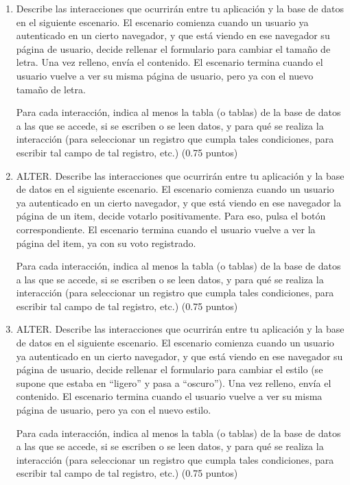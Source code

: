 \begin{enumerate}
\item Describe las interacciones que ocurrirán entre tu aplicación y la base de datos en el siguiente escenario. El escenario comienza cuando un usuario ya autenticado en un cierto navegador, y que está viendo en ese navegador su página de usuario, decide rellenar el formulario para cambiar el tamaño de letra. Una vez relleno, envía el contenido. El escenario termina cuando el usuario vuelve a ver su misma página de usuario, pero ya con el nuevo tamaño de letra.
  
  Para cada interacción, indica al menos la tabla (o tablas) de la base de datos a las que se accede, si se escriben o se leen datos, y para qué se realiza la interacción (para seleccionar un registro que cumpla tales condiciones, para escribir tal campo de tal registro, etc.)  (0.75 puntos)

  
\item ALTER. Describe las interacciones que ocurrirán entre tu aplicación y la base de datos en el siguiente escenario. El escenario comienza cuando un usuario ya autenticado en un cierto navegador, y que está viendo en ese navegador la página de un item, decide votarlo positivamente. Para eso, pulsa el botón correspondiente. El escenario termina cuando el usuario vuelve a ver la página del item, ya con su voto registrado.

  Para cada interacción, indica al menos la tabla (o tablas) de la base de datos a las que se accede, si se escriben o se leen datos, y para qué se realiza la interacción (para seleccionar un registro que cumpla tales condiciones, para escribir tal campo de tal registro, etc.) (0.75 puntos)

\item ALTER. Describe las interacciones que ocurrirán entre tu aplicación y la base de datos en el siguiente escenario. El escenario comienza cuando un usuario ya autenticado en un cierto navegador, y que está viendo en ese navegador su página de usuario, decide rellenar el formulario para cambiar el estilo (se supone que estaba en ``ligero'' y pasa a ``oscuro''). Una vez relleno, envía el contenido. El escenario termina cuando el usuario vuelve a ver su misma página de usuario, pero ya con el nuevo estilo.

  Para cada interacción, indica al menos la tabla (o tablas) de la base de datos a las que se accede, si se escriben o se leen datos, y para qué se realiza la interacción (para seleccionar un registro que cumpla tales condiciones, para escribir tal campo de tal registro, etc.) (0.75 puntos)


\end{enumerate}
